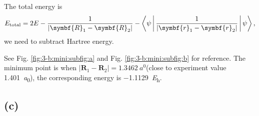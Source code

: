 \documentclass[12pt]{article}
\begin{document}
The total energy is
\begin{equation}
    E_{\text{total}} = 2 E - \frac{1}{\lvert \symbf{R}_1 - \symbf{R}_2 \rvert} -
    \Braket{\psi | \frac{1}{\lvert \symbf{r}_1 - \symbf{r}_2 \rvert} | \psi },
\end{equation}
we need to subtract Hartree energy.


See Fig. \ref{fig:3-b:mini:subfig:a} and Fig. \ref{fig:3-b:mini:subfig:b}
for reference. The minimum point is when $\lvert \symbf{R}_1- \symbf{R}_2 \rvert = \SI{1.3462}{\bohr}$(close
to experiment value \SI{1.401}{\bohr}), the
corresponding energy is \SI{-1.1129}{\hartree}.

\subsection*{(c)}
\end{document}
